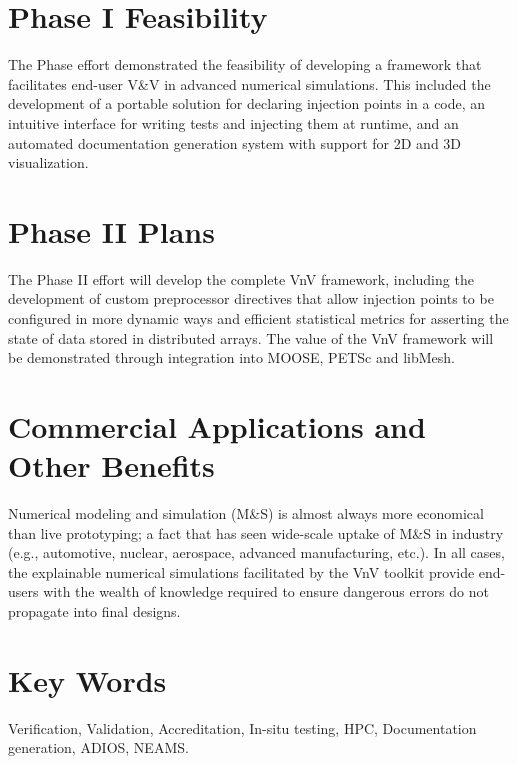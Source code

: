 \section*{Phase I Feasibility}
The Phase effort demonstrated the feasibility of developing a framework that facilitates end-user V\&V
in advanced numerical simulations. This included the development of 
a portable solution for declaring injection points in a code, an intuitive interface 
for writing tests and injecting them at runtime, and an automated documentation generation
system with support for 2D and 3D visualization. 

\section*{Phase II Plans}
The Phase II effort will develop the complete VnV framework, including the development
of custom preprocessor directives that allow injection points to be configured in more dynamic ways 
and efficient statistical metrics for asserting the state of data 
stored in distributed arrays. The value of the VnV framework will be demonstrated through integration
into MOOSE, PETSc and libMesh. 

\section*{Commercial Applications and Other Benefits}
Numerical modeling and simulation (M\&S) is almost always more economical than live prototyping; 
a fact that has seen wide-scale uptake of M\&S in industry (e.g., automotive, nuclear, 
aerospace, advanced manufacturing, etc.). In all cases, the explainable numerical simulations facilitated
by the VnV toolkit provide end-users with the wealth of knowledge required to ensure dangerous errors
do not propagate into final designs. 

\section*{Key Words}
Verification, Validation, Accreditation, In-situ testing,
HPC, Documentation generation, ADIOS, NEAMS.

